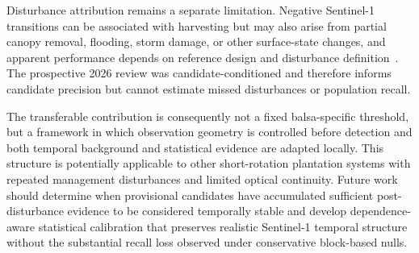 Disturbance attribution remains a separate limitation. Negative Sentinel-1 transitions can be associated with harvesting but may also arise from partial canopy removal, flooding, storm damage, or other surface-state changes, and apparent performance depends on reference design and disturbance definition~\citep{RodriguezPaulino2024Review}. The prospective 2026 review was candidate-conditioned and therefore informs candidate precision but cannot estimate missed disturbances or population recall.

The transferable contribution is consequently not a fixed balsa-specific threshold, but a framework in which observation geometry is controlled before detection and both temporal background and statistical evidence are adapted locally. This structure is potentially applicable to other short-rotation plantation systems with repeated management disturbances and limited optical continuity. Future work should determine when provisional candidates have accumulated sufficient post-disturbance evidence to be considered temporally stable and develop dependence-aware statistical calibration that preserves realistic Sentinel-1 temporal structure without the substantial recall loss observed under conservative block-based nulls.